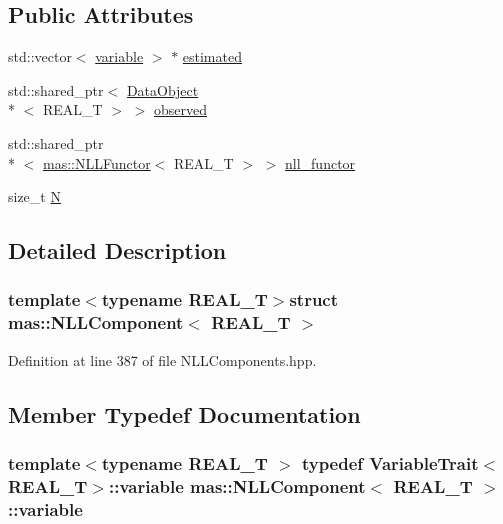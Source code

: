 \subsection*{Public Attributes}
\begin{DoxyCompactItemize}
\item 
std\-::vector$<$ \hyperlink{structmas_1_1_n_l_l_component_a867afdda641b99341b7ebcbaea001f94}{variable} $>$ $\ast$ \hyperlink{structmas_1_1_n_l_l_component_a1d5439e34e306b6d3cfabfa7511f4885}{estimated}
\item 
std\-::shared\-\_\-ptr$<$ \hyperlink{structmas_1_1_data_object}{Data\-Object}\\*
$<$ R\-E\-A\-L\-\_\-\-T $>$ $>$ \hyperlink{structmas_1_1_n_l_l_component_a82a2b4e08e4b1f9509aae06b0622bcef}{observed}
\item 
std\-::shared\-\_\-ptr\\*
$<$ \hyperlink{structmas_1_1_n_l_l_functor}{mas\-::\-N\-L\-L\-Functor}$<$ R\-E\-A\-L\-\_\-\-T $>$ $>$ \hyperlink{structmas_1_1_n_l_l_component_aac558bbcbc7a6d23b86b59bde0b2feed}{nll\-\_\-functor}
\item 
size\-\_\-t \hyperlink{structmas_1_1_n_l_l_component_ae00089e4495dceff480b3e5d757a28c8}{N}
\end{DoxyCompactItemize}


\subsection{Detailed Description}
\subsubsection*{template$<$typename R\-E\-A\-L\-\_\-\-T$>$struct mas\-::\-N\-L\-L\-Component$<$ R\-E\-A\-L\-\_\-\-T $>$}



Definition at line 387 of file N\-L\-L\-Components.\-hpp.



\subsection{Member Typedef Documentation}
\hypertarget{structmas_1_1_n_l_l_component_a867afdda641b99341b7ebcbaea001f94}{
\subsubsection[{variable}]{\setlength{\rightskip}{0pt plus 5cm}template$<$typename R\-E\-A\-L\-\_\-\-T $>$ typedef {\bf Variable\-Trait}$<$R\-E\-A\-L\-\_\-\-T$>$\-::{\bf variable} {\bf mas\-::\-N\-L\-L\-Component}$<$ R\-E\-A\-L\-\_\-\-T $>$\-::{\bf variable}}}\label{structmas_1_1_n_l_l_component_a867afdda641b99341b7ebcbaea001f94}


